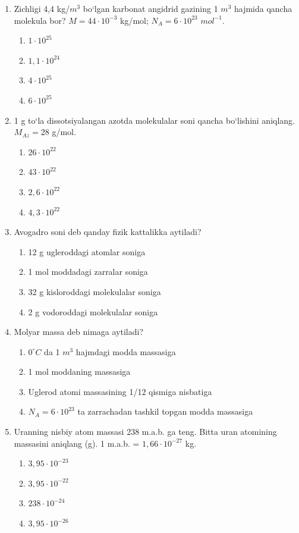 \begin{enumerate}
\item Zichligi 4,4 kg/$m^3$ bo‘lgan karbonat angidrid gazining 1 $m^3$ hajmida qancha molekula bor? $M = 44 \cdot 10^{-3}$ kg/mol; $N_A = 6 \cdot 10^{23}$ $mol^{-1}$.
\begin{enumerate}[label=\Alph*)]
\item $1 \cdot 10^{25}$
\item $1,1 \cdot 10^{24}$
\item $4 \cdot 10^{25}$
\item $6 \cdot 10^{25}$
\end{enumerate}

\item 1 g to‘la dissotsiyalangan azotda molekulalar soni qancha bo‘lishini aniqlang. $M_{Az} = 28$ g/mol.
\begin{enumerate}[label=\Alph*)]
\item $26 \cdot 10^{22}$
\item $43 \cdot 10^{22}$
\item $2,6 \cdot 10^{22}$
\item $4,3 \cdot 10^{22}$
\end{enumerate}

\item Avogadro soni deb qanday fizik kattalikka aytiladi?
\begin{enumerate}[label=\Alph*)]
\item 12 g ugleroddagi atomlar soniga
\item 1 mol moddadagi zarralar soniga
\item 32 g kisloroddagi molekulalar soniga
\item 2 g vodoroddagi molekulalar soniga
\end{enumerate}

\item Molyar massa deb nimaga aytiladi?
\begin{enumerate}[label=\Alph*)]
\item $0^\circ C$ da 1 $m^3$ hajmdagi modda massasiga
\item 1 mol moddaning massasiga
\item Uglerod atomi massasining 1/12 qismiga nisbatiga
\item $N_A = 6 \cdot 10^{23}$ ta zarrachadan tashkil topgan modda massasiga
\end{enumerate}

\item Uranning nisbiy atom massasi 238 m.a.b. ga teng. Bitta uran atomining massasini aniqlang (g). 1 m.a.b. = $1,66 \cdot 10^{-27}$ kg.
\begin{enumerate}[label=\Alph*)]
\item $3,95 \cdot 10^{-23}$
\item $3,95 \cdot 10^{-22}$
\item $238 \cdot 10^{-24}$
\item $3,95 \cdot 10^{-26}$
\end{enumerate}

\end{enumerate}



